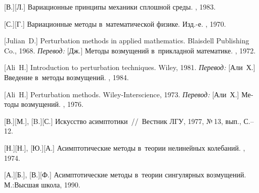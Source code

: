 \begin{thebibliography}{123}
\begin{otherlanguage}{russian}
[В.][Л.] Вариационные принципы механики сплошной среды. \naukapublisher, 1983. 

[С.][Г.] Вариационные методы в~математической физике. Изд.\hbox{-}е. \naukapublisher, 1970. 

%
%



[Julian~D.] Perturbation methods in applied mathematics. Blaisdell Publishing Co., 1968. 
\emph{Перевод:} [Дж.] Методы возмущений в~прикладной математике. \mirpublisher, 1972. 

[Ali~H.] Introduction to perturbation techniques. Wiley, 1981. 
\emph{Перевод:} [Али~Х.] Введение в~методы возмущений. \mirpublisher, 1984. 

[Ali~H.] Perturbation methods. Wiley-Interscience, 1973. 
\emph{Перевод:} [Али~Х.] Методы возмущений. \mirpublisher, 1976. 

[В.][М.], [B.][С.] Искусство асимптотики~//~Вестник ЛГУ, 1977, №\,13, вып., С.\hbox{--}12.

[Н.][Н.], [Ю.][А.] Асимптотические методы в~теории нелинейных колебаний. \naukapublisher, 1974. 

[А.][Б.], [В.][Ф.] Асимптотические методы в~теории сингулярных возмущений. М.:\;Высшая школа, 1990. 


\end{otherlanguage}
\end{thebibliography}
